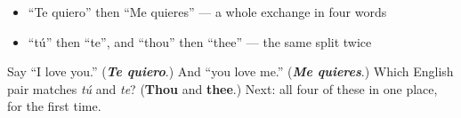 \begin{itemize}
\raggedright
  \item \textquotedblleft{}Te quiero\textquotedblright{} then \textquotedblleft{}Me quieres\textquotedblright{} — a whole exchange in four words
  \item \textquotedblleft{}tú\textquotedblright{} then \textquotedblleft{}te\textquotedblright{}, and \textquotedblleft{}thou\textquotedblright{} then \textquotedblleft{}thee\textquotedblright{} — the same split twice
\end{itemize}

\begin{tcolorbox}[breakable,colback=teal!4,colframe=teal!35!black,title={Before you move on}]
Say \textquotedblleft{}I love you.\textquotedblright{} (\emph{\textbf{Te quiero}}.) And \textquotedblleft{}you love me.\textquotedblright{} (\emph{\textbf{Me quieres}}.) Which English pair matches \emph{tú} and \emph{te}? (\textbf{Thou} and \textbf{thee}.) Next: all four of these in one place, for the first time.
\end{tcolorbox}
